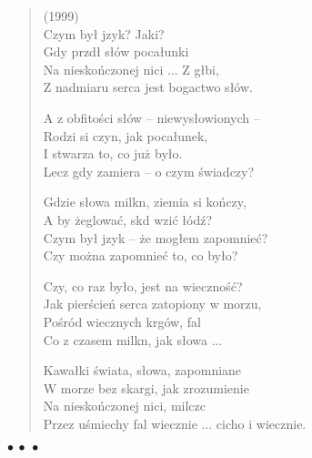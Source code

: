 \documentclass{article} %
\newenvironment{wierszd}[2]
	{\begin{verse} \hspace*{-1em}{\bf #1}\hfill{\small{(#2)}}\\[.5ex] }
	{\end{verse} \begin{center}$\bullet\ \bullet\ \bullet$\end{center}}
\newcommand{\e}{\eob}
\renewcommand{\a}{\aob}
\renewcommand{\o}{\'{o}}
\newcommand{\z}{\'{z}}
\newcommand{\n}{\'{n}}
\newcommand{\s}{\'{s}}
\newcommand{\ci}{\'{c}}
\begin{document}
\begin{wierszd}{}{1999}
Czym by{\l} j{\e}zyk? Jaki? \\
Gdy prz{\a}d{\l} s{\l}{\o}w poca{\l}unki\\
Na niesko{\n}czonej nici ... Z g{\l}{\e}bi,\\
Z nadmiaru serca jest bogactwo s{\l}{\o}w.

A z obfito{\s}ci s{\l}{\o}w -- niewys{\l}owionych -- \\
Rodzi si{\e} czyn, jak poca{\l}unek,\\
I stwarza to, co ju\.{z} by{\l}o.\\
Lecz gdy zamiera -- o czym {\s}wiadczy?

Gdzie s{\l}owa milkn{\a}, ziemia si{\e} ko{\n}czy, \\
A by \.{z}eglowa{\ci}, sk{\a}d wzi{\a}{\ci} {\l}{\o}d{\z}?\\
Czym by{\l} j{\e}zyk -- \.{z}e mog{\l}em zapomnie{\ci}?\\
Czy mo\.{z}na zapomnie{\ci} to, co by{\l}o?

Czy, co raz by{\l}o, jest na wieczno{\s}{\ci}?\\
Jak pier{\s}cie{\n} serca zatopiony w morzu,\\
Po{\s}r{\o}d wiecznych kr{\e}g{\o}w, fal\\
Co z czasem milkn{\a}, jak s{\l}owa ...

Kawa{\l}ki {\s}wiata, s{\l}owa, zapomniane\\
W morze bez skargi, jak zrozumienie\\
Na niesko{\n}czonej nici, milcz{\a}c\\
Przez u{\s}miechy fal wiecznie ... cicho i wiecznie.
\end{wierszd}
%
\end{document}
